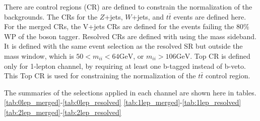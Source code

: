 There are control regions (CR) are defined to constrain the normalization of the backgrounds. The CRs for the $Z$+jets, $W$+jets, and $t\bar{t}$ events are defined here.
For the merged CRs, the V+jets CRs are defined for the events failing the 80$\%$ WP of the boson tagger. Resolved CRs are defined with using the mass sideband. It is defined with the same event selection as the resolved SR but outside the mass window, which is $50<m_{i i}<64 \mathrm{GeV}$, or $m_{i i}>106 \mathrm{GeV}$.
Top CR is defined only for 1-lepton channel, by requiring at least one b-tagged instead of b-veto. This Top CR is used for constraining the normalization of the $t\bar{t}$ control region. 

The summaries of the selections applied in each channel are shown here in tables.
\ref{tab:0lep_merged}-\ref{tab:0lep_resolved}
\ref{tab:1lep_merged}-\ref{tab:1lep_resolved}
\ref{tab:2lep_merged}-\ref{tab:2lep_resolved}

